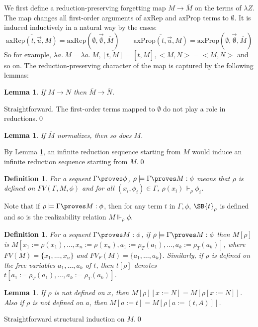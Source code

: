 \documentclass{LMCS}
\newtheorem{definition}[thm]{Definition}
\newtheorem{lemma}[thm]{Lemma}
\newcommand{\ov}[1]{\ensuremath{\overline{#1}}}
\newcommand\reals{\ensuremath{\Vdash}}
\newcommand{\g}{\Gamma}
\newcommand{\gp}{\Gamma \proves}
\newcommand{\pl}[1]{\ensuremath{\mathrm{#1}}}
\newcommand{\lz}{\lambda Z}
\begin{document}
We first define a reduction-preserving forgetting map $M \to \ov{M}$ on the terms of
$\lz$. The map changes all first-order arguments of $\pl{axRep}$ and
$\pl{axProp}$ terms to $\emptyset$. It is induced inductively in a natural way by the cases:
\[
\ov{\pl{axRep}(t, \vec{u}, M)} = \pl{axRep}(\emptyset, \vec{\emptyset}, \ov{M})
\qquad
\ov{\pl{axProp}(t, \vec{u}, M)} = \pl{axProp}(\emptyset, \vec{\emptyset}, \ov{M})
\]
So for example, $\ov{\lambda a.\ M} = \lambda a.\ \ov{M}, \ov{[t, M]} = [t,
\ov{M}], \ov{<M, N>} = <\ov{M}, \ov{N}>$ and so on. The reduction-preserving
character of the map is captured by the following lemmas:

\begin{lemma}\label{en1}
If $M \to N$ then $\ov{M} \to \ov{N}$. 
\end{lemma}
\proof Straightforward. The first-order terms mapped to $\emptyset$ do not play a
role in reductions.\qed


\begin{lemma}\label{erasurenorm}
If $\ov{M}$ normalizes, then so does $M$. 
\end{lemma}
\proof By Lemma \ref{en1}, an infinite reduction sequence starting from $M$ would
induce an infinite reduction sequence starting from $\ov{M}$.\qed


\begin{definition}
For a sequent $\gp \phi$, $\rho \models \gp M : \phi$ means that $\rho$ is
defined on $FV(\Gamma, M, \phi)$ and for all $(x_i, \phi_i) \in \g$, $\rho(x_i) \reals_\rho \phi_i$.
\end{definition}

Note that if $\rho \models \gp M : \phi$, then for any term $t$ in $\g, \phi$,
$\SB{t}_{\rho}$ is defined and so is the realizability relation $M
\reals_{\rho} \phi$.

\begin{definition}
For a sequent $\gp M : \phi$, if $\rho \models \gp M : \phi$ then $M[\rho]$
is $M[x_1 := \rho(x_1), {\ldots} , x_n := \rho(x_n), a_1:=\rho_T(a_1),
{\ldots}, a_k:=\rho_T(a_k)]$, where $FV(M) = \{ x_1, {\ldots}, x_n \}$ and $FV_F(M) = \{ a_1, {\ldots} , a_k \}$.
Similarly, if $\rho$ is defined on the free variables $a_1, {\ldots} , a_k$
of $t$, then $t[\rho]$ denotes $t[a_1:=\rho_T(a_1), {\ldots} ,
a_k:=\rho_T(a_k)]$. 
\end{definition}

\begin{lemma}\label{rhosubst}
If $\rho$ is not defined on $x$, then $M[\rho][x:=N] = M[\rho[x:=N]]$. Also
if $\rho$ is not defined on $a$, then $M[a:=t] = M[\rho[a:=(t, A)]]$. 
\end{lemma}
\proof Straightforward structural induction on $M$.\qed
\end{document}
